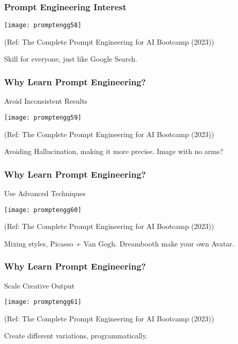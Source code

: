 \begin{frame}[fragile]\frametitle{Prompt Engineering Interest}

\begin{center}
\texttt{[image: promptengg58]}

{\tiny (Ref: The Complete Prompt Engineering for AI Bootcamp (2023))}

\end{center}		

Skill for everyone, just like Google Search.
		
\end{frame}

\begin{frame}[fragile]\frametitle{Why Learn Prompt Engineering?}

Avoid Inconsistent Results

\begin{center}
\texttt{[image: promptengg59]}

{\tiny (Ref: The Complete Prompt Engineering for AI Bootcamp (2023))}

\end{center}	


Avoiding Hallucination, making it more precise. Image with no arms?
			
\end{frame}

\begin{frame}[fragile]\frametitle{Why Learn Prompt Engineering?}

Use Advanced Techniques

\begin{center}
\texttt{[image: promptengg60]}

{\tiny (Ref: The Complete Prompt Engineering for AI Bootcamp (2023))}
\end{center}	

Mixing styles, Picasso + Van Gogh. 
Dreambooth make your own Avatar.
			
\end{frame}

\begin{frame}[fragile]\frametitle{Why Learn Prompt Engineering?}

Scale Creative Output

\begin{center}
\texttt{[image: promptengg61]}

{\tiny (Ref: The Complete Prompt Engineering for AI Bootcamp (2023))}
\end{center}	

Create different variations, programmatically.
			
\end{frame}


